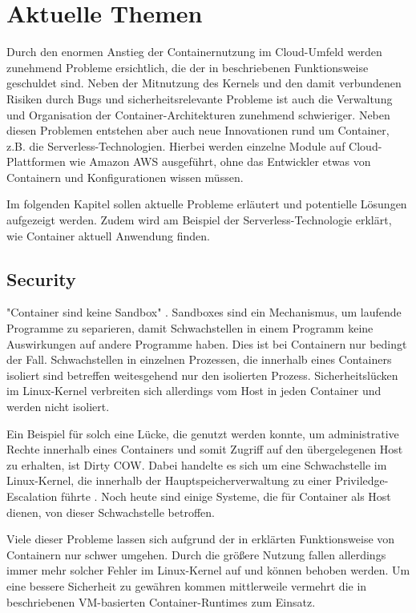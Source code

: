 \chapter{Aktuelle Themen}
\label{chap:aktuelles}

Durch den enormen Anstieg der Containernutzung im Cloud-Umfeld werden zunehmend Probleme ersichtlich, die der in  beschriebenen Funktionsweise geschuldet sind. Neben der Mitnutzung des Kernels und den damit verbundenen Risiken durch Bugs und sicherheitsrelevante Probleme ist auch die Verwaltung und Organisation der Container-Architekturen zunehmend schwieriger. Neben diesen Problemen entstehen aber auch neue Innovationen rund um Container, z.B. die Serverless-Technologien. Hierbei werden einzelne Module auf Cloud-Plattformen wie Amazon AWS ausgeführt, ohne das Entwickler etwas von Containern und Konfigurationen wissen müssen.

Im folgenden Kapitel sollen aktuelle Probleme erläutert und potentielle Lösungen aufgezeigt werden. Zudem wird am Beispiel der Serverless-Technologie erklärt, wie Container aktuell Anwendung finden.

\section{Security}
\label{sec:aktuellesSecurity}

"Container sind keine Sandbox" \citep{OpenSourcingGVisoraSandboxedContainerRuntime}. Sandboxes sind ein Mechanismus, um laufende Programme zu separieren, damit Schwachstellen in einem Programm keine Auswirkungen auf andere Programme haben. Dies ist bei Containern nur bedingt der Fall. Schwachstellen in einzelnen Prozessen, die innerhalb eines Containers isoliert sind betreffen weitesgehend nur den isolierten Prozess. Sicherheitslücken im Linux-Kernel verbreiten sich allerdings vom Host in jeden Container und werden nicht isoliert.

Ein Beispiel für solch eine Lücke, die genutzt werden konnte, um administrative Rechte innerhalb eines Containers und somit Zugriff auf den übergelegenen Host zu erhalten, ist Dirty COW. Dabei handelte es sich um eine Schwachstelle im Linux-Kernel, die innerhalb der Hauptspeicherverwaltung zu einer Priviledge-Escalation führte \citep{DirtyCOWCVE20165195}. Noch heute sind einige Systeme, die für Container als Host dienen, von dieser Schwachstelle betroffen.

Viele dieser Probleme lassen sich aufgrund der in  erklärten Funktionsweise von Containern nur schwer umgehen. Durch die größere Nutzung fallen allerdings immer mehr solcher Fehler im Linux-Kernel auf und können behoben werden. Um eine bessere Sicherheit zu gewähren kommen mittlerweile vermehrt die in  beschriebenen VM-basierten Container-Runtimes zum Einsatz.

